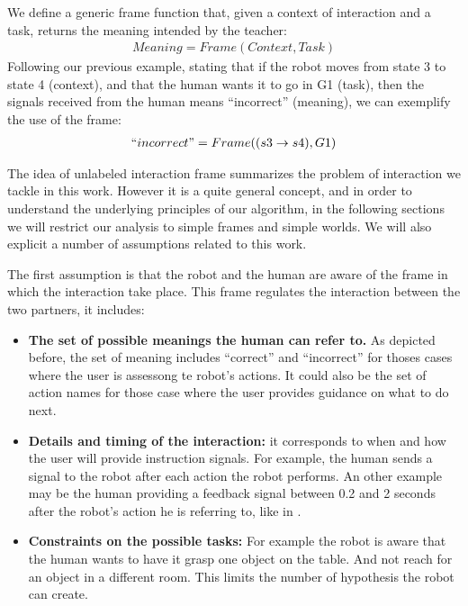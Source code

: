 We define a generic frame function that, given a context of interaction and a task, returns the meaning intended by the teacher:
%
\begin{eqnarray}
Meaning = Frame(Context, Task)
\end{eqnarray}
%
Following our previous example, stating that if the robot moves from state 3 to state 4 (context), and that the human wants it to go in G1 (task), then the signals received from the human means ``incorrect'' (meaning), we can exemplify the use of the frame:
%
\begin{eqnarray}
``incorrect" = Frame((s3 \rightarrow s4), G1)
\end{eqnarray}

\transition

The idea of unlabeled interaction frame summarizes the problem of interaction we tackle in this work. However it is a quite general concept, and in order to understand the underlying principles of our algorithm, in the following sections we will restrict our analysis to simple frames and simple worlds. We will also explicit a number of assumptions related to this work.

The first assumption is that the robot and the human are aware of the frame in which the interaction take place. This frame regulates the interaction between the two partners, it includes:

\begin{itemize}

\item \textbf{The set of possible meanings the human can refer to.} As depicted before, the set of meaning includes ``correct'' and ``incorrect'' for thoses cases where the user is assessong te robot's actions. It could also be the set of action names for those case where the user provides guidance on what to do next.

\item \textbf{Details and timing of the interaction:} it corresponds to when and how the user will provide instruction signals. For example, the human sends a signal to the robot after each action the robot performs. An other example may be the human providing a feedback signal between 0.2 and 2 seconds after the robot's action he is referring to, like in \cite{knox2009interactively}.

\item \textbf{Constraints on the possible tasks:} For example the robot is aware that the human wants to have it grasp one object on the table. And not reach for an object in a different room. This limits the number of hypothesis the robot can create.

\end{itemize}


